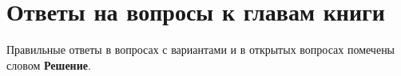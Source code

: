 ﻿\chapter{Ответы на вопросы к главам книги}


Правильные ответы в вопросах с вариантами и в открытых вопросах помечены словом \textbf{Решение}.


% 



% 








